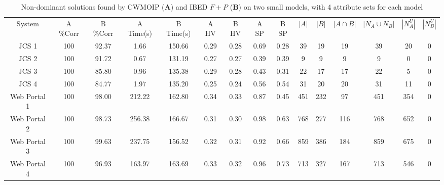 \begin{table*}[t]
  \centering
   \scriptsize
   \vspace{-1mm}
  \caption{Non-dominant solutions found by CWMOIP (\textbf{A}) and  IBED $F+P$ (\textbf{B}) on two small models, with 4 attribute sets for each model}
    \begin{tabular}{|c|c|c|c|c|c|c|c|c|c|c|c|c|c|c|}
  \Xhline{2\arrayrulewidth}
    System & A \%Corr & B \%Corr & A Time(s) & B Time(s) &A HV & B HV & A SP & B SP & $|A|$ & $|B|$ & $|A \cap B|$ & \textbf{$|N_A \cup N_B|$} & \textbf{$|N^{U}_A|$} & \textbf{$|N^{U}_B|$} \bigstrut\\
   \Xhline{2\arrayrulewidth}
    JCS 1 & 100   & 92.37  & 1.66  & 150.66  & 0.29  & 0.28  & 0.69  & 0.28  & 39    & 19    & 19    & 39    & 20    & 0 \bigstrut\\
    \hline
    JCS 2 & 100   & 91.72  & 0.67  & 131.19  & 0.27  & 0.27  & 0.39  & 0.39  & 9     & 9     & 9     & 9     & 0     & 0 \bigstrut\\
    \hline
    JCS 3 & 100   & 85.80  & 0.96  & 135.38  & 0.29  & 0.28  & 0.43  & 0.31  & 22    & 17    & 17    & 22    & 5     & 0 \bigstrut\\
    \hline
    JCS 4 & 100   & 84.77  & 1.97  & 135.20  & 0.25  & 0.24  & 0.56  & 0.54  & 31    & 20    & 20    & 31    & 11    & 0 \bigstrut\\
    \hline
    Web Portal 1 & 100   & 98.00  & 212.22  & 162.80  & 0.34  & 0.33  & 0.87  & 0.45  & 451   & 232   & 97    & 451   & 354   & 0 \bigstrut\\
    \hline
    Web Portal 2 & 100   & 98.73  & 256.38  & 166.67  & 0.31  & 0.30  & 0.98  & 0.63  & 768   & 277   & 116   & 768   & 652   & 0 \bigstrut\\
    \hline
    Web Portal 3 & 100   & 99.63  & 237.75  & 156.52  & 0.32  & 0.31  & 0.92  & 0.66  & 859   & 386   & 184   & 859   & 675   & 0 \bigstrut\\
    \hline
    Web Portal 4 & 100   & 96.93  & 163.97  & 163.69  & 0.33  & 0.32  & 0.96  & 0.73  & 713   & 327   & 167   & 713   & 546   & 0 \bigstrut\\
    \hline
    \end{tabular}%
  \label{tab:cwmoipVSibed}%
\vspace{-3mm}
\end{table*}%
